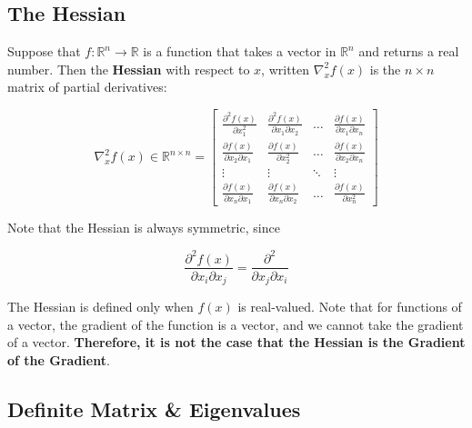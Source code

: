 \documentclass{article}
\begin{document}
\subsection{The Hessian}

\begin{definition}
    
Suppose that $f: \mathbb{R}^{n}\to \mathbb{R}$ is a function that takes a vector in $\mathbb{R}^{n}$ and returns a real number. Then the \textbf{Hessian} with respect to $x$, written $\nabla^{2}_x f(x)$ is the $n\times n$ matrix of partial derivatives:


\begin{equation}
    \nabla^{2}_x f(x) \in \mathbb{R}^{n\times n} = \begin{bmatrix}
        \frac{\partial^{2} f(x)}{\partial x^{2}_{1}} & \frac{\partial^{2} f(x)}{\partial x_{1}\partial x_{2}} & \dots & \frac{\partial f(x)}{\partial x_{1} \partial x_n} \\ 
        \frac{\partial f(x)}{\partial x_{2} \partial x_{1}} & \frac{\partial f(x)}{\partial x^{2}_{2}} & \dots & \frac{\partial f(x)}{\partial x_{2} \partial x_n} \\ 
        \vdots & \vdots & \ddots & \vdots \\ 
        \frac{\partial f(x)}{\partial x_{n} \partial x_{1}} & \frac{\partial f(x)}{\partial x_{n} \partial x_{2}} &  \dots & \frac{\partial f(x)}{\partial x^{2}_{n}}
    \end{bmatrix}
\end{equation}

\end{definition}

\noindent Note that the Hessian is always symmetric, since 

\begin{equation*}
    \frac{\partial^{2} f(x)}{\partial x_i \partial x_j} = \frac{\partial^{2}}{\partial x_j \partial x_i}
\end{equation*}

\noindent The Hessian is defined only when $f(x)$ is real-valued. Note that for functions of a vector, the gradient of the function is a vector, and we cannot take the gradient of a vector.\textbf{ Therefore, it is not the case that the Hessian is the Gradient of the Gradient}. 

\subsection{Definite Matrix \& Eigenvalues}
\end{document}
